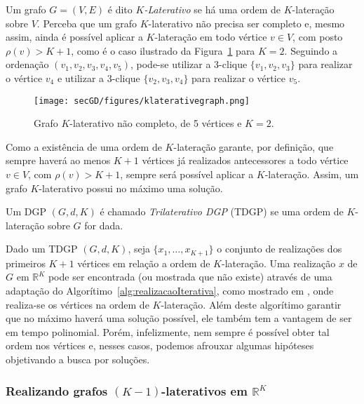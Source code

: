 Um grafo $G = (V,E)$ é dito \textit{$K$-Laterativo} se há uma ordem de $K$-lateração sobre $V$. Perceba que um grafo $K$-laterativo não precisa ser completo e, mesmo assim, ainda é possível aplicar a $K$-lateração em todo vértice $v \in V$, com posto $\rho(v) >K+1$, como é o caso ilustrado da Figura~\ref{fig:klaterativegraph} para $K = 2$. Seguindo a ordenação $(v_1, v_2, v_3, v_4, v_5)$, pode-se utilizar a $3$-clique $\{v_1,v_2,v_3\}$ para realizar o vértice $v_4$ e utilizar a $3$-clique $\{v_2,v_3,v_4\}$ para realizar o vértice $v_5$.

\begin{figure}[H]
	\begin{center}
		\texttt{[image: secGD/figures/klaterativegraph.png]}
	\end{center}
	\caption{Grafo $K$-laterativo não completo, de 5 vértices e $K = 2$.}
	\label{fig:klaterativegraph}
\end{figure}

Como a existência de uma ordem de $K$-lateração garante, por definição, que sempre haverá ao menos $K+1$ vértices já realizados antecessores a todo vértice $v \in V$, com $\rho(v) > K+1$, sempre será possível aplicar a $K$-lateração. Assim, um grafo $K$-laterativo possui no máximo uma solução.

\begin{definicao}
	Um DGP $(G,d,K)$ é chamado \textit{Trilaterativo DGP} (TDGP) se uma ordem de $K$-lateração sobre $G$ for dada.
\end{definicao}

Dado um TDGP $(G,d,K)$, seja $\{x_1, \dots,x_{K+1}\}$ o conjunto de realizações dos primeiros $K+1$ vértices em relação a ordem de $K$-lateração. Uma realização $x$ de $G$ em $\mathbb{R}^K$ pode ser encontrada (ou mostrada que não existe) através de uma adaptação do Algorítimo~\ref{alg:realizacaoIterativa}, como mostrado em \cite{libertiEDG}, onde realiza-se os vértices na ordem de $K$-lateração. Além deste algorítimo garantir que no máximo haverá uma solução possível, ele também tem a vantagem de ser em tempo polinomial. Porém, infelizmente, nem sempre é possível obter tal ordem nos vértices e, nesses casos, podemos afrouxar algumas hipóteses objetivando a busca por soluções.

\subsubsection{Realizando grafos $(K-1)$-laterativos em $\mathbb{R}^K$}

